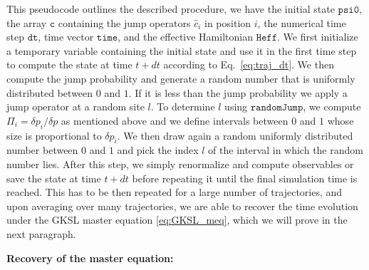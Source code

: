 This pseudocode outlines the described procedure, we have the initial state $\texttt{psi0}$, the array $\texttt{c}$ containing the jump operators $\hat{c}_i$ in position $i$, the numerical time step $\texttt{dt}$, time vector $\texttt{time}$, and the effective Hamiltonian $\texttt{Heff}$. We first initialize a temporary variable containing the initial state and use it in the first time step to compute the state at time $t+dt$ according to Eq.~\ref{eq:traj_dt}. We then compute the jump probability and generate a random number that is uniformly distributed between $0$ and $1$. If it is less than the jump probability we apply a jump operator at a random site $l$. To determine $l$ using $\texttt{randomJump}$, we compute $\Pi_i = \delta p_i/\delta p$ as mentioned above and we define intervals between $0$ and $1$ whose size is proportional to $\delta p_i$. We then draw again a random uniformly distributed number between $0$ and $1$ and pick the index $l$ of the interval in which the random number lies. After this step, we simply renormalize and compute observables or save the state at time $t+dt$ before repeating it until the final simulation time is reached. This has to be then repeated for a large number of trajectories, and upon averaging over many trajectories, we are able to recover the time evolution under the GKSL master equation \ref{eq:GKSL_meq}, which we will prove in the next paragraph.

\textbf{Recovery of the master equation:}

